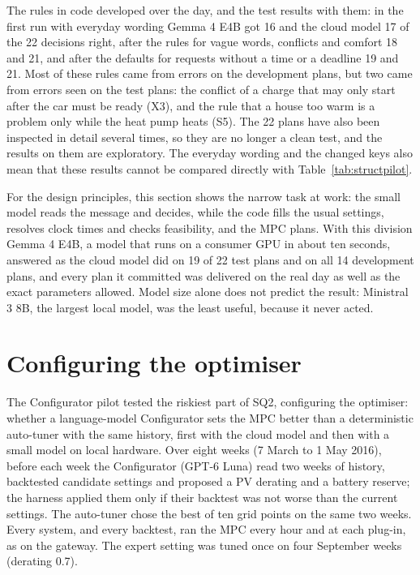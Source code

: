 The rules in code developed over the day, and the test results with
them: in the first run with everyday wording Gemma 4 E4B got 16 and the
cloud model 17 of the 22 decisions right, after the rules for vague
words, conflicts and comfort 18 and 21, and after the defaults for
requests without a time or a deadline 19 and 21. Most of these rules came from errors
on the development plans, but two came from errors seen on the test
plans: the conflict of a charge that may only start after the car must
be ready (X3), and the rule that a house too warm is a problem only
while the heat pump heats (S5). The 22 plans have also been inspected
in detail several times, so they are no longer a clean test, and the
results on them are exploratory.
The everyday wording and the changed keys also mean that these results
cannot be compared directly with Table~\ref{tab:structpilot}.

For the design principles, this section shows the narrow task at
work: the small model reads the message and decides, while the code
fills the usual settings, resolves clock times and checks feasibility,
and the MPC plans. With this division Gemma 4 E4B, a model that runs on
a consumer GPU in about ten seconds, answered as the cloud model did on
19 of 22 test plans and on all 14 development plans, and every plan it
committed was delivered on the real day as well as the exact parameters
allowed. Model size alone does not predict the result: Ministral 3 8B,
the largest local model, was the least useful, because it never acted.

\section{Configuring the optimiser}
\label{sec:configpilot}

The Configurator pilot tested the riskiest part of SQ2, configuring the
optimiser: whether a language-model Configurator sets the MPC better
than a deterministic auto-tuner with the same history, first with the
cloud model and then with a small model on local hardware. Over eight weeks (7 March to 1 May 2016), before each week
the Configurator (GPT-6 Luna) read two weeks of history, backtested
candidate settings and proposed a PV derating and a battery reserve; the
harness applied them only if their backtest was not worse than the
current settings. The auto-tuner chose the best of ten grid points on
the same two weeks. Every system, and every backtest, ran the MPC every
hour and at each plug-in, as on the gateway. The expert setting was
tuned once on four September weeks (derating 0.7).

